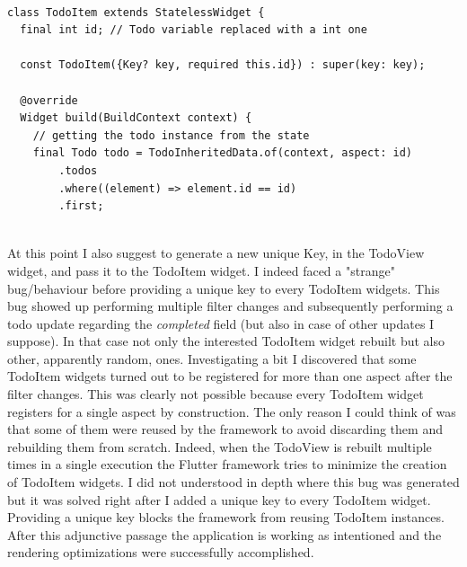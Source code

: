 \mbox{}\\
\begin{code}

\label{code:2.48}
\begin{verbatim}
class TodoItem extends StatelessWidget {
  final int id; // Todo variable replaced with a int one

  const TodoItem({Key? key, required this.id}) : super(key: key);

  @override
  Widget build(BuildContext context) {
  	// getting the todo instance from the state
    final Todo todo = TodoInheritedData.of(context, aspect: id)
        .todos
        .where((element) => element.id == id)
        .first;
\end{verbatim}
\end{code}
\mbox{}\\
At this point I also suggest to generate a new unique Key, in the TodoView widget, and pass it to the TodoItem widget. I indeed faced a "strange" bug/behaviour before providing a unique key to every TodoItem widgets. This bug showed up performing multiple filter changes and subsequently performing a todo update regarding the \textit{completed  }field (but also in case of other updates I suppose). In that case not only the interested TodoItem widget rebuilt but also other, apparently random, ones. Investigating a bit I discovered that some TodoItem widgets turned out to be registered for more than one aspect after the filter changes. This was clearly not possible because every TodoItem widget registers for a single aspect by construction. The only reason I could think of was that some of them were reused by the framework to avoid discarding them and rebuilding them from scratch. Indeed, when the TodoView is rebuilt multiple times in a single execution the Flutter framework tries to minimize the creation of TodoItem widgets. I did not understood in depth where this bug was generated but it was solved right after I added a unique key to every TodoItem widget. Providing a unique key blocks the framework from reusing TodoItem instances. 
After this adjunctive passage the application is working as intentioned and the rendering optimizations were successfully accomplished. \\



